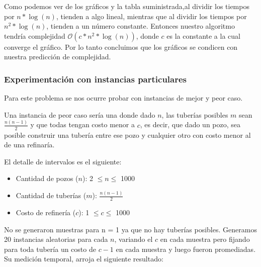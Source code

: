 Como podemos ver de los gráficos y la tabla suministrada,al dividir los tiempos por $n* \log(n)$, tienden a algo lineal, mientras que al dividir los tiempos por $n^2* \log(n)$, tienden a un número constante. Entonces nuestro algoritmo tendría complejidad $\mathcal{O}(c*n^2* \log(n))$, donde $c$ es la constante a la cual converge el gráfico. Por lo tanto concluimos que los gráficos se condicen con nuestra predicción de complejidad.


\subsubsection{Experimentación con instancias particulares}

Para este problema se nos ocurre probar con instancias de mejor y peor caso.


Una instancia de peor caso sería una donde dado $n$, las tuberías posibles $m$ sean $\frac{n(n-1)}{2}$ y que todas tengan costo menor a $c$, es decir, que dado un pozo, sea posible construir una tubería entre ese pozo y cualquier otro con costo menor al de una refinaría.

El detalle de intervalos es el siguiente:
\begin{itemize}
	\item Cantidad de pozos ($n$): 2 $\leq n \leq$ 1000
    \item Cantidad de tuberías ($m$): $\frac{n(n-1)}{2}$
    \item Costo de refinería ($c$): 1 $\leq c \leq$ 1000
\end{itemize}

No se generaron muestras para n = 1 ya que no hay tuberías posibles.
Generamos 20 instancias aleatorias para cada $n$, variando el $c$ en cada muestra pero fijando para toda tubería un costo de $c-1$ en cada muestra y luego fueron promediadas. Su medición temporal, arroja el siguiente resultado:

